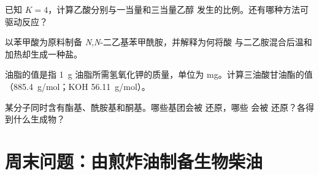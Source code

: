 \begin{exercise}[$\star\star$]\label{exo:b2:acyl-substitution:9}
已知 $K = 4$，计算乙酸分别与一当量和三当量乙醇
发生的比例。还有哪种方法可驱动反应？
\end{exercise}

\begin{exercise}[$\star\star\star$]\label{exo:b2:acyl-substitution:10}
以苯甲酸为原料制备 \textit{N},\textit{N}-二乙基苯甲酰胺，并解释为何将酸
与二乙胺混合后温和加热却生成一种盐。
\end{exercise}

\begin{exercise}[$\star\star\star$]\label{exo:b2:acyl-substitution:11}
油脂的值是指
\qty{1}{g} 油脂所需氢氧化钾的质量，单位为 mg。计算三油酸甘油酯的值（\qty{885.4}{g/mol}；KOH \qty{56.11}{g/mol}）。
\end{exercise}

\begin{exercise}[$\star\star\star$]\label{exo:b2:acyl-substitution:12}
某分子同时含有酯基、酰胺基和酮基。哪些基团会被  还原，哪些
会被  还原？各得到什么生成物？
\end{exercise}

\section{周末问题：由煎炸油制备生物柴油}

